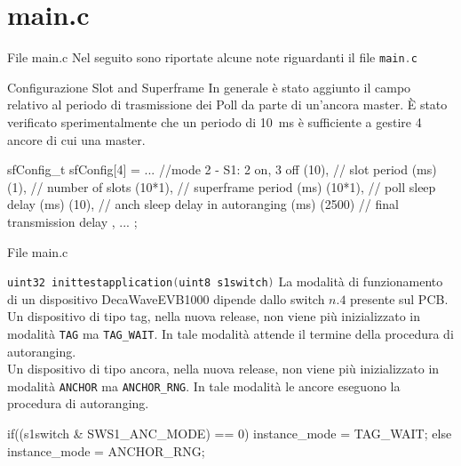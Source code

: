 \section{main.c}
\begin{frame}[fragile, shrink=15]{File main.c}
  Nel seguito sono riportate alcune note riguardanti il file \lstinline[language=C]!main.c!
  \begin{block}{Configurazione Slot and Superframe}
    In generale è stato aggiunto il campo relativo al periodo di trasmissione dei Poll
    da parte di un'ancora master. È stato verificato sperimentalmente che un periodo di \SI{10}{\milli\second} è
    sufficiente a gestire 4 ancore di cui una master.
    \begin{C}
      sfConfig_t sfConfig[4] =
      {
      ...
      //mode 2 - S1: 2 on, 3 off
      {
        (10),   // slot period (ms)
        (1),    // number of slots
        (10*1), // superframe period (ms)
        (10*1), // poll sleep delay (ms)
        (10),   // anch sleep delay in autoranging (ms)
        (2500)  // final transmission delay
      },
      ...
    };
  \end{C}
  \end{block}
\end{frame}

\begin{frame}[fragile, shrink=15]{File main.c}
  \begin{block}{\lstinline[language=C]!uint32 inittestapplication(uint8 s1switch)!}
    La modalità di funzionamento di un dispositivo DecaWaveEVB1000 dipende
    dallo switch $n.4$ presente sul PCB.\\
    Un dispositivo di tipo tag, nella nuova release, non viene più inizializzato in modalità
    \lstinline[language=C]!TAG! ma \lstinline[language=C]!TAG_WAIT!. In tale modalità attende il termine della procedura
    di autoranging.\\
    Un dispositivo di tipo ancora, nella nuova release, non viene più inizializzato in modalità
    \lstinline[language=C]!ANCHOR! ma \lstinline[language=C]!ANCHOR_RNG!. In tale modalità le ancore eseguono la procedura
    di autoranging.
    \begin{C}
    if((s1switch & SWS1_ANC_MODE) == 0)
    {
      instance_mode = TAG_WAIT;
    }
    else
    {
      instance_mode = ANCHOR_RNG;
    }
    \end{C}
  \end{block}
\end{frame}

